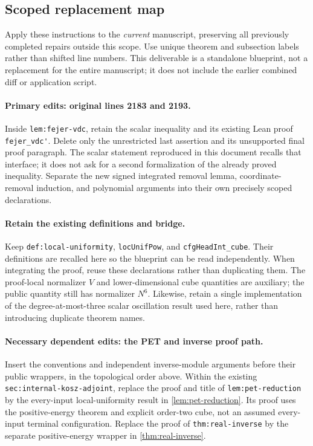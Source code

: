 \documentclass[11pt]{article}
\theoremstyle{definition}
\newcommand{\pid}[1]{\nolinkurl{#1}}
\begin{document}
\subsection{Scoped replacement map}
Apply these instructions to the \emph{current} manuscript, preserving all previously completed
repairs outside this scope.  Use unique theorem and subsection labels rather than shifted
line numbers.  This deliverable is a standalone blueprint, not a replacement for the entire
manuscript; it does not include the earlier combined diff or application script.

\paragraph{Primary edits: original lines 2183 and 2193.}
Inside \pid{lem:fejer-vdc}, retain the scalar inequality and its existing Lean proof
\pid{fejer_vdc'}.  Delete only the unrestricted last assertion and its unsupported final
proof paragraph.  The scalar statement reproduced in this document recalls that interface;
it does not ask for a second formalization of the already proved inequality.
Separate the new signed integrated removal lemma, coordinate-removal induction, and
polynomial arguments into their own precisely scoped declarations.

\paragraph{Retain the existing definitions and bridge.}
Keep \pid{def:local-uniformity}, \pid{locUnifPow}, and \pid{cfgHeadInt_cube}.
Their definitions are recalled here so the blueprint can be read independently.
When integrating the proof, reuse these declarations rather than duplicating them.
The proof-local normalizer $V$ and lower-dimensional cube quantities are auxiliary;
the public quantity still has normalizer $N^6$.
Likewise, retain a single implementation of the degree-at-most-three scalar oscillation
result used here, rather than introducing duplicate theorem names.

\paragraph{Necessary dependent edits: the PET and inverse proof path.}
Insert the conventions and independent inverse-module arguments before their public
wrappers, in the topological order above.  Within the existing
\pid{sec:internal-kosz-adjoint}, replace the proof and title of \pid{lem:pet-reduction}
by the every-input local-uniformity result in \cref{lem:pet-reduction}.
Its proof uses the positive-energy theorem and explicit order-two cube, not an assumed
every-input terminal configuration.  Replace the proof of \pid{thm:real-inverse}
by the separate positive-energy wrapper in \cref{thm:real-inverse}.
\end{document}

